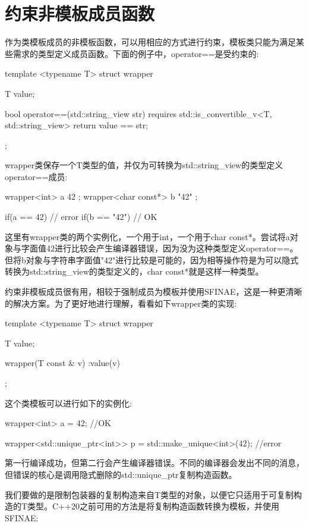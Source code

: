 \section{约束非模板成员函数}
作为类模板成员的非模板函数，可以用相应的方式进行约束，模板类只能为满足某些需求的类型定义成员函数。下面的例子中，operator==是受约束的:

\begin{cpp}
template <typename T>
struct wrapper
{
	T value;
	
	bool operator==(std::string_view str)
	requires std::is_convertible_v<T, std::string_view>
	{
		return value == str;
	}
};
\end{cpp}

wrapper类保存一个T类型的值，并仅为可转换为std::string\_view的类型定义operator==成员:

\begin{cpp}
wrapper<int> a{ 42 };
wrapper<char const*> b{ "42" };

if(a == 42) {} // error
if(b == "42") {} // OK
\end{cpp}

这里有wrapper类的两个实例化，一个用于int，一个用于char const*。尝试将a对象与字面值42进行比较会产生编译器错误，因为没为这种类型定义operator==。但将b对象与字符串字面值"42"进行比较是可能的，因为相等操作符是为可以隐式转换为std::string\_view的类型定义的，char const*就是这样一种类型。

约束非模板成员很有用，相较于强制成员为模板并使用SFINAE，这是一种更清晰的解决方案。为了更好地进行理解，看看如下wrapper类的实现:

\begin{cpp}
template <typename T>
struct wrapper
{
	T value;
	
	wrapper(T const & v) :value(v) {}
};
\end{cpp}

这个类模板可以进行如下的实例化:

\begin{cpp}
wrapper<int> a = 42; //OK

wrapper<std::unique_ptr<int>> p =
	std::make_unique<int>(42); //error
\end{cpp}

第一行编译成功，但第二行会产生编译器错误。不同的编译器会发出不同的消息，但错误的核心是调用隐式删除的std::unique\_ptr复制构造函数。

我们要做的是限制包装器的复制构造来自T类型的对象，以便它只适用于可复制构造的T类型。C++20之前可用的方法是将复制构造函数转换为模板，并使用SFINAE:

